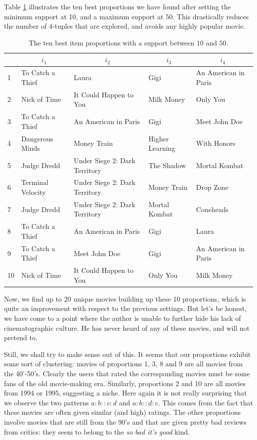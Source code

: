 Table \ref{TAB:best_prop_num_basic_10_50} illustrates the ten best proportions
we have found after setting the minimum support at 10, and a maximum support at
50. This drastically reduces the number of $4$-tuples that are explored, and
avoids any highly popular movie.
\begin{table}[h!]
\centering
  \begin{tabular}{ l l  l  l l }
\toprule
    &\multicolumn{1}{c}{$i_1$}  & \multicolumn{1}{c}{$i_2$} &
    \multicolumn{1}{c}{$i_3$} & \multicolumn{1}{c}{$i_4$}\\
  \midrule
  1&   To Catch a Thief  & Laura  & Gigi  & An American in Paris  \\
  2&   Nick of Time  & It Could Happen to You  & Milk Money & Only You  \\
  3& To Catch a Thief  & An American in Paris  & Gigi  & Meet John Doe   \\
  4& Dangerous Minds  & Money Train  & Higher Learning  & With Honors   \\
  5& Judge Dredd  & Under Siege 2: Dark Territory  & The Shadow  & Mortal Kombat   \\
  6& Terminal Velocity & Under Siege 2: Dark Territory  & Money Train  & Drop Zone    \\
  7& Judge Dredd  &Under Siege 2: Dark Territory  &  Mortal Kombat  & Coneheads   \\
  8& To Catch a Thief  & An American in Paris  & Gigi  & Laura   \\
  9&  To Catch a Thief  & Meet John Doe  & Gigi  & An American in Paris   \\
 10&   Nick of Time  & It Could Happen to You  & Only You  & Milk Money   \\
\bottomrule
\end{tabular}
  \caption{The ten best item proportions with a support between $10$ and $50$.}
  \label{TAB:best_prop_num_basic_10_50}
\end{table}
Now, we find up to 20 unique movies building up these 10 proportions, which is
quite an improvement with respect to the previous settings. But let's be
honest, we have come to a point where the author is unable to further hide his
lack of cinematographic culture. He has never heard of any of these movies, and
will not pretend to.

Still, we shall try to make sense out of this. It seems that our proportions
exhibit some sort of clustering: movies of proportions 1, 3, 8 and 9 are all
movies from the 40'-50's. Clearly the users that rated the corresponding
movies must be some fans of the old movie-making era. Similarly, proportions 2
and 10 are all movies from 1994 or 1995, suggesting a niche. Here again it is
not really surprising that we observe the two patterns $a:b::c:d$ and
$a:b::d:c$. This comes from the fact that these movies are often given similar
(and high) ratings. The other proportions involve movies that are still from the
90's and that are given pretty bad reviews from critics: they seem to belong to
the \textit{so bad it's good} kind.

